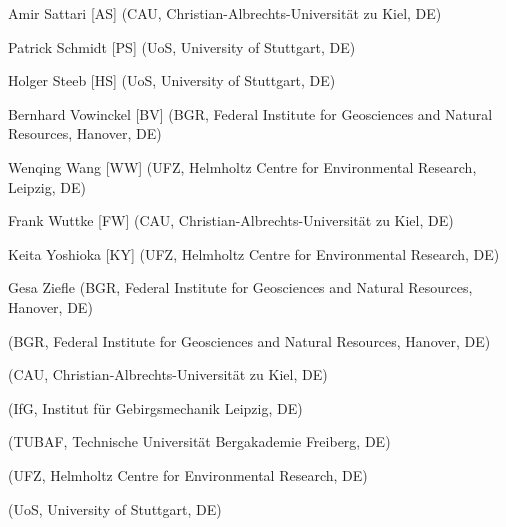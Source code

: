 \begin{list}{-}{\leftmargin=1em \itemindent=0em \itemsep=0.1em}
\item Amir Sattari [AS] (CAU, Christian-Albrechts-Universität zu Kiel, DE)	

\item Patrick Schmidt [PS] (UoS, University of Stuttgart, DE)	

\item Holger Steeb [HS] (UoS, University of Stuttgart, DE)	

\item Bernhard Vowinckel [BV] (BGR, Federal Institute for Geosciences and Natural Resources, Hanover, DE)	

\item Wenqing Wang [WW] (UFZ, Helmholtz Centre for Environmental Research, Leipzig, DE) 

\item Frank Wuttke [FW] (CAU, Christian-Albrechts-Universität zu Kiel, DE)	

\item Keita Yoshioka [KY] (UFZ, Helmholtz Centre for Environmental Research, DE) 

\item Gesa Ziefle (BGR, Federal Institute for Geosciences and Natural Resources, Hanover, DE)	

\item [] (BGR, Federal Institute for Geosciences and Natural Resources, Hanover, DE)	
\item [] (CAU, Christian-Albrechts-Universität zu Kiel, DE)	
\item [] (IfG, Institut für Gebirgsmechanik Leipzig, DE)	
\item [] (TUBAF, Technische Universität Bergakademie Freiberg, DE)	
\item [] (UFZ, Helmholtz Centre for Environmental Research, DE)	
\item [] (UoS, University of Stuttgart, DE)	

\end{list}
